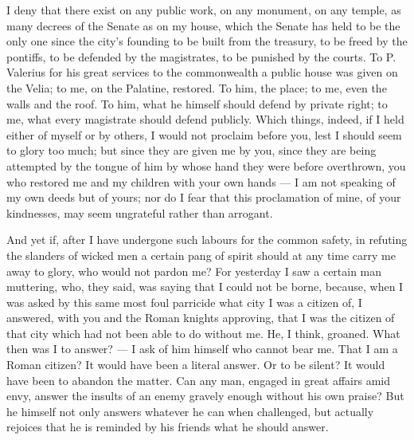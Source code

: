  I deny that there exist on any public work, on any monument, on any temple, as many decrees of the Senate as on my house, which the Senate has held to be the only one since the city's founding to be built from the treasury, to be freed by the pontiffs, to be defended by the magistrates, to be punished by the courts. To P. Valerius for his great services to the commonwealth a public house was given on the Velia; to me, on the Palatine, restored. To him, the place; to me, even the walls and the roof. To him, what he himself should defend by private right; to me, what every magistrate should defend publicly. Which things, indeed, if I held either of myself or by others, I would not proclaim before you, lest I should seem to glory too much; but since they are given me by you, since they are being attempted by the tongue of him by whose hand they were before overthrown, you who restored me and my children with your own hands --- I am not speaking of my own deeds but of yours; nor do I fear that this proclamation of mine, of your kindnesses, may seem ungrateful rather than arrogant.

 And yet if, after I have undergone such labours for the common safety, in refuting the slanders of wicked men a certain pang of spirit should at any time carry me away to glory, who would not pardon me? For yesterday I saw a certain man muttering, who, they said, was saying that I could not be borne, because, when I was asked by this same most foul parricide what city I was a citizen of, I answered, with you and the Roman knights approving, that I was the citizen of that city which had not been able to do without me. He, I think, groaned. What then was I to answer? --- I ask of him himself who cannot bear me. That I am a Roman citizen? It would have been a literal answer. Or to be silent? It would have been to abandon the matter. Can any man, engaged in great affairs amid envy, answer the insults of an enemy gravely enough without his own praise? But he himself not only answers whatever he can when challenged, but actually rejoices that he is reminded by his friends what he should answer.

